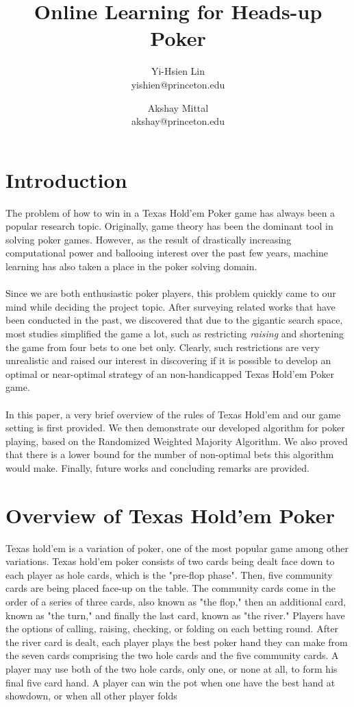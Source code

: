 \documentclass[12pt]{article}
\begin{document}
\title{Online Learning for Heads-up Poker}
\author{
	Yi-Hsien Lin \\ yishien@princeton.edu \and
	Akshay Mittal \\ akshay@princeton.edu
}
\date{}

\maketitle

\section{Introduction}
The problem of how to win in a Texas Hold'em Poker game has always been a popular research topic. Originally, game theory has been the dominant tool in solving poker games. However, as the result of drastically increasing computational power and ballooing interest over the past few years, machine learning  has also taken a place in the poker solving domain.\\
\\
Since we are both enthusiastic poker players, this problem quickly came to our mind while deciding the project topic. After surveying related works that have been conducted in the past, we discovered that due to the gigantic search space, most studies simplified the game a lot, such as restricting \emph{raising} and shortening the game from four bets to one bet only.
Clearly, such restrictions are very unrealistic and raised our interest in discovering if it is possible to develop an optimal or near-optimal strategy of an non-handicapped Texas Hold'em Poker game.\\
\\
In this paper, a very brief overview of the rules of Texas Hold'em and our game setting is first provided. We then demonstrate our developed algorithm for poker playing, based on the Randomized Weighted Majority Algorithm. We also proved that there is a lower bound for the number of non-optimal bets this algorithm would make. Finally, future works and concluding remarks are provided.


\section{Overview of Texas Hold'em Poker}
Texas hold'em is a variation of poker, one of the most popular game among other variations. Texas hold'em poker consists of two cards being dealt face down to each player as hole cards, which is the "pre-flop phase". Then, five community cards are being placed face-up on the table. The community cards come in the order of a series of three cards, also known as "the flop," then an additional card, known as "the turn," and finally the last card, known as "the river." Players have the options of calling, raising, checking, or folding on each betting round. After the river card is dealt, each player plays the best poker hand they can make from the seven cards comprising the two hole cards and the five community cards. A player may use both of the two hole cards, only one, or none at all, to form his final five card hand. A player can win the pot when one have the best hand at showdown, or when all other player folds
\end{document}
